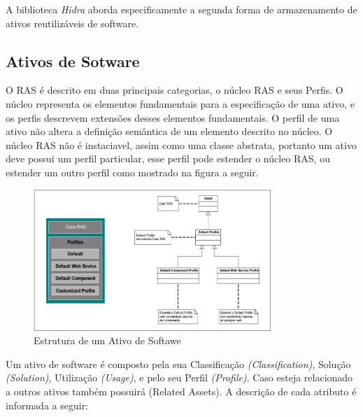     A biblioteca \textit{Hidra} aborda especificamente a segunda forma de armazenamento de ativos reutilizáveis de software.

\subsection{Ativos de Sotware}

    O RAS é descrito em duas principais categorias, o núcleo RAS e seus Perfis. O núcleo representa os elementos fundamentais para a especificação de uma ativo, e os perfis descrevem extensões desses elementos fundamentais. O perfil de uma ativo não altera a definição semântica de um elemento descrito no núcleo. O núcleo RAS não é instaciavel, assim como uma classe abstrata, portanto um ativo deve possui um perfil particular, esse perfil pode estender o núcleo RAS, ou estender um outro perfil como mostrado na figura a seguir.


\begin{figure}[H]
\includegraphics[width=0.8\textwidth]{images/estruturaAsset}
\centering
\caption{Estrutura de um Ativo de Softawe \cite{dissertacaoHenriqueFaria2005}}
\label{Rotulo}
\end{figure}

Um ativo de software é composto pela sua Classificação \textit{(Classification)}, Solução \textit{(Solution)}, Utilização \textit{(Usage)}, e pelo seu Perfil \textit{(Profile)}. Caso esteja relacionado a outros ativos também possuirá (Related Assets). A descrição de cada atributo é informada a seguir:

